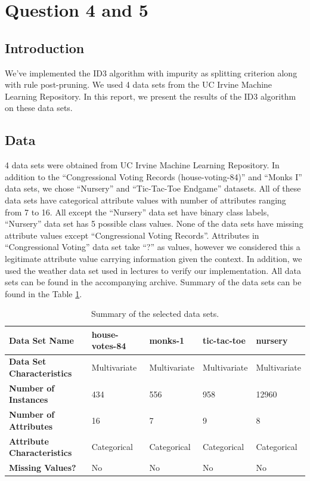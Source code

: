 \documentclass[12pt]{article}
\begin{document}
\section{Question 4 and 5}

\subsection{Introduction}
We've implemented the ID3 algorithm with impurity as splitting criterion along with rule post-pruning. We used 4 data sets from the UC Irvine Machine Learning Repository. In this report, we present the results of the ID3 algorithm on these data sets.

\subsection{Data}
4 data sets were obtained from UC Irvine Machine Learning
Repository. In addition to the ``Congressional Voting Records
(house-voting-84)'' and ``Monks I'' data sets, we chose ``Nursery''
and ``Tic-Tac-Toe Endgame'' datasets. All of these data sets have
categorical attribute values with number of attributes ranging from 7
to 16. All except the ``Nursery'' data set have binary class labels,
``Nursery'' data set has 5 possible class values. None of the data
sets have missing attribute values except ``Congressional Voting
Records''. Attributes in ``Congressional Voting'' data set take ``?''
as values, however we considered this a legitimate attribute value
carrying information given the context. In addition, we used the
weather data set used in lectures to verify our implementation.  All
data sets can be found in the accompanying archive. Summary of the
data sets can be found in the Table \ref{table:datasetsummary}.

\begin{table}[H]
  \centering
  \begin{small}
    \begin{tabular}{|l|l|l|l|l|}
      \hline
      \textbf{Data Set Name}             & house-votes-84 & monks-1      & tic-tac-toe  & nursery      \\ \hline
      \textbf{Data Set Characteristics}  & Multivariate   & Multivariate & Multivariate & Multivariate \\ \hline
      \textbf{Number of Instances}       & 434            & 556          & 958          & 12960        \\ \hline
      \textbf{Number of Attributes}      & 16             & 7            & 9            & 8            \\ \hline
      \textbf{Attribute Characteristics} & Categorical    & Categorical  & Categorical  & Categorical  \\ \hline
      \textbf{Missing Values?}           & No             & No           & No           & No           \\ \hline
    \end{tabular}
  \end{small}
  \caption{Summary of the selected data sets.}
  \label{table:datasetsummary}
\end{table}
\end{document}
